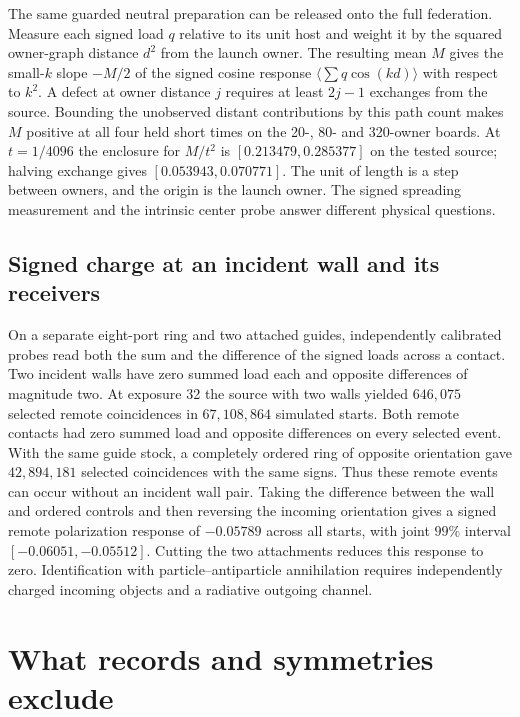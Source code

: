 \documentclass[11pt]{article}
\begin{document}
The same guarded neutral preparation can be released onto the full
federation. Measure each signed load $q$ relative to its unit host and
weight it by the squared owner-graph distance $d^2$ from the launch
owner. The resulting mean $M$ gives the small-$k$ slope $-M/2$ of the
signed cosine response $\langle\sum q\cos(kd)\rangle$ with respect to
$k^2$. A defect at owner distance $j$ requires at least $2j-1$ exchanges
from the source. Bounding the unobserved distant contributions by this
path count makes $M$ positive at all four held short times on the
20-, 80- and 320-owner boards. At $t=1/4096$ the enclosure for
$M/t^2$ is $[0.213479,0.285377]$ on the tested source; halving exchange
gives $[0.053943,0.070771]$. The unit of length is a step between
owners, and the origin is the launch owner. The signed spreading
measurement and the intrinsic center probe answer different physical
questions.

\subsection{Signed charge at an incident wall and its receivers}

On a separate eight-port ring and two attached guides, independently
calibrated probes read both the sum and the difference of the signed
loads across a contact. Two incident walls have zero summed load each
and opposite differences of magnitude two. At exposure 32 the source
with two walls yielded $646{,}075$ selected remote coincidences in
$67{,}108{,}864$ simulated starts. Both remote contacts had zero summed
load and opposite differences on every selected event. With the same
guide stock, a completely ordered ring of opposite orientation gave
$42{,}894{,}181$ selected coincidences with the same signs. Thus these
remote events can occur without an incident wall pair. Taking the
difference between the wall and ordered controls and then reversing
the incoming orientation gives a signed remote polarization response
of $-0.05789$ across all starts, with joint $99\%$ interval
$[-0.06051,-0.05512]$. Cutting the two attachments reduces this
response to zero. Identification with particle--antiparticle
annihilation requires independently charged incoming objects and a
radiative outgoing channel.

\section{What records and symmetries exclude}
\label{sec:exclusions}
\end{document}
